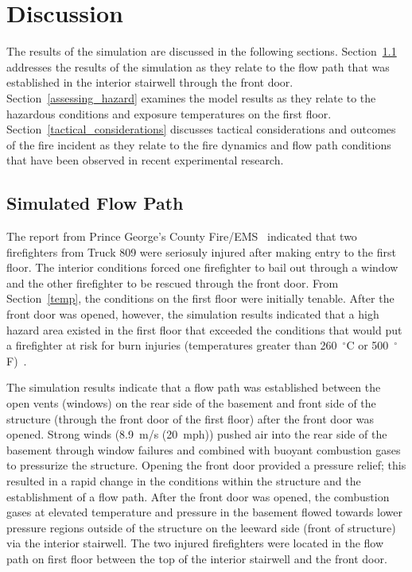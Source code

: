 \documentclass[12pt,oneside]{book}
\begin{document}
\clearpage

\chapter{Discussion}
\label{discuss}
The results of the simulation are discussed in the following sections. Section~\ref{simulated_flow_path} addresses the results of the simulation as they relate to the flow path that was established in the interior stairwell through the front door. Section~\ref{assessing_hazard} examines the model results as they relate to the hazardous conditions and exposure temperatures on the first floor. Section~\ref{tactical_considerations} discusses tactical considerations and outcomes of the fire incident as they relate to the fire dynamics and flow path conditions that have been observed in recent experimental research.

\section{Simulated Flow Path}
\label{simulated_flow_path}

The report from Prince George's County Fire/EMS~\cite{PGCounty2013} indicated that two firefighters from Truck 809 were seriosuly injured after making entry to the first floor. The interior conditions forced one firefighter to bail out through a window and the other firefighter to be rescued through the front door. From Section~\ref{temp}, the conditions on the first floor were initially tenable. After the front door was opened, however, the simulation results indicated that a high hazard area existed in the first floor that exceeded the conditions that would put a firefighter at risk for burn injuries (temperatures greater than 260~$^{\circ}$C or 500~$^{\circ}$F)~\cite{nfpa2013standard}.

The simulation results indicate that a flow path was established between the open vents (windows) on the rear side of the basement and front side of the structure (through the front door of the first floor) after the front door was opened. Strong winds (8.9~m/s (20~mph)) pushed air into the rear side of the basement through window failures and combined with buoyant combustion gases to pressurize the structure. Opening the front door provided a pressure relief; this resulted in a rapid change in the conditions within the structure and the establishment of a flow path. After the front door was opened, the combustion gases at elevated temperature and pressure in the basement flowed towards lower pressure regions outside of the structure on the leeward side (front of structure) via the interior stairwell. The two injured firefighters were located in the flow path on first floor between the top of the interior stairwell and the front door.
\end{document}
